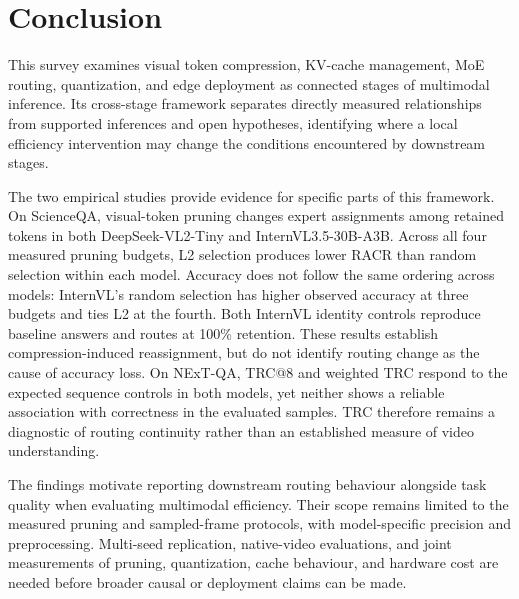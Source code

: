 \documentclass[10pt]{article}
\newenvironment{reviewchange}{\begingroup\color{red}}{\endgroup}
\begin{document}
\begin{reviewchange}
\section{Conclusion}
\label{sec:conclusion}

This survey examines visual token compression, KV-cache management, MoE routing,
quantization, and edge deployment as connected stages of multimodal inference.
Its cross-stage framework separates directly measured relationships from supported
inferences and open hypotheses, identifying where a local efficiency intervention
may change the conditions encountered by downstream stages.

The two empirical studies provide evidence for specific parts of this framework.
On ScienceQA, visual-token pruning changes expert assignments among retained tokens
in both DeepSeek-VL2-Tiny and InternVL3.5-30B-A3B. Across all four measured pruning
budgets, L2 selection produces lower RACR than random selection within each model.
Accuracy does not follow the same ordering across models: InternVL's random
selection has higher observed accuracy at three budgets and ties L2 at the fourth.
Both InternVL identity controls reproduce baseline answers and routes at 100\%
retention. These results establish compression-induced reassignment, but do not
identify routing change as the cause of accuracy loss. On NExT-QA, TRC@8 and weighted
TRC respond to the expected sequence controls in both models, yet neither shows a
reliable association with correctness in the evaluated samples. TRC therefore
remains a diagnostic of routing continuity rather than an established measure of
video understanding.

The findings motivate reporting downstream routing behaviour alongside task quality
when evaluating multimodal efficiency. Their scope remains limited to the measured
pruning and sampled-frame protocols, with model-specific precision and preprocessing.
Multi-seed replication, native-video evaluations, and joint measurements of pruning,
quantization, cache behaviour, and hardware cost are needed before broader causal
or deployment claims can be made.


\newpage
\end{reviewchange}



\end{document}
